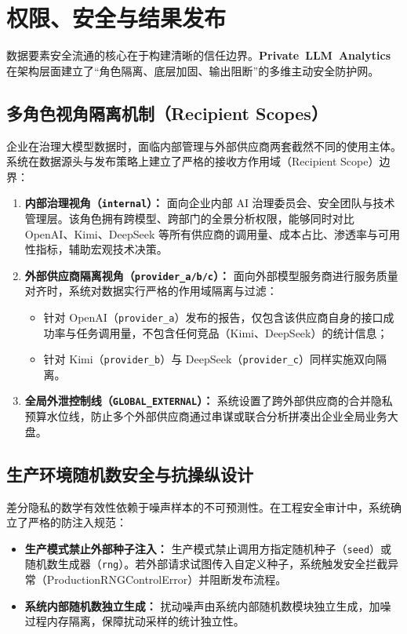 \section{权限、安全与结果发布}
\label{sec:security_and_release}

数据要素安全流通的核心在于构建清晰的信任边界。\textbf{\mbox{Private LLM Analytics}} 在架构层面建立了“角色隔离、底层加固、输出阻断”的多维主动安全防护网。

\subsection{多角色视角隔离机制（Recipient Scopes）}
企业在治理大模型数据时，面临内部管理与外部供应商两套截然不同的使用主体。系统在数据源头与发布策略上建立了严格的接收方作用域（Recipient Scope）边界：
\begin{enumerate}[label=\textbf{\arabic*.}, leftmargin=2em]
  \item \textbf{内部治理视角（\texttt{internal}）：} 面向企业内部 AI 治理委员会、安全团队与技术管理层。该角色拥有跨模型、跨部门的全景分析权限，能够同时对比 OpenAI、Kimi、DeepSeek 等所有供应商的调用量、成本占比、渗透率与可用性指标，辅助宏观技术决策。
  \item \textbf{外部供应商隔离视角（\texttt{provider\_a/b/c}）：} 面向外部模型服务商进行服务质量对齐时，系统对数据实行严格的作用域隔离与过滤：
  \begin{itemize}
    \item 针对 OpenAI（\texttt{provider\_a}）发布的报告，仅包含该供应商自身的接口成功率与任务调用量，不包含任何竞品（Kimi、DeepSeek）的统计信息；
    \item 针对 Kimi（\texttt{provider\_b}）与 DeepSeek（\texttt{provider\_c}）同样实施双向隔离。
  \end{itemize}
  \item \textbf{全局外泄控制线（\texttt{GLOBAL\_EXTERNAL}）：} 系统设置了跨外部供应商的合并隐私预算水位线，防止多个外部供应商通过串谋或联合分析拼凑出企业全局业务大盘。
\end{enumerate}

\subsection{生产环境随机数安全与抗操纵设计}
差分隐私的数学有效性依赖于噪声样本的不可预测性。在工程安全审计中，系统确立了严格的防注入规范：
\begin{itemize}[leftmargin=2em]
  \item \textbf{生产模式禁止外部种子注入：} 生产模式禁止调用方指定随机种子（\texttt{seed}）或随机数生成器（\texttt{rng}）。若外部请求试图传入自定义种子，系统触发安全拦截异常（ProductionRNGControlError）并阻断发布流程。
  \item \textbf{系统内部随机数独立生成：} 扰动噪声由系统内部随机数模块独立生成，加噪过程内存隔离，保障扰动采样的统计独立性。
\end{itemize}

